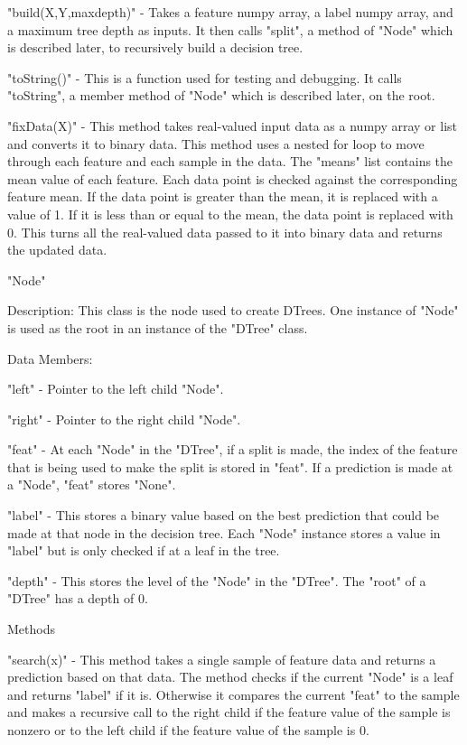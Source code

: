\documentclass{article}
\begin{document}
\indent \textbullet "build(X,Y,max\textunderscore depth)" - Takes a feature numpy array, a label numpy array, and a maximum tree depth as inputs. It then calls "split", a method of "Node" which is described later, to recursively build a decision tree. 

\indent \textbullet "toString()" - This is a function used for testing and debugging. It calls "toString", a member method of "Node" which is described later, on the root.

\indent \textbullet "fixData(X)" - This method takes real-valued input data as a numpy array or list and converts it to binary data. This method uses a nested for loop to move through each feature and each sample in the data. The "means" list contains the mean value of each feature. Each data point is checked against the corresponding feature mean. If the data point is greater than the mean, it is replaced with a value of 1. If it is less than or equal to the mean, the data point is replaced with 0. This turns all the real-valued data passed to it into binary data and returns the updated data. 

\pagebreak

\noindent "Node"

\indent Description: This class is the node used to create DTrees. One instance of "Node" is used as the root in an instance of the "DTree" class. 

\indent Data Members:

\indent \textbullet "left" - Pointer to the left child "Node".

\indent \textbullet "right" - Pointer to the right child "Node".

\indent \textbullet "feat" - At each "Node" in the "DTree", if a split is made, the index of the feature that is being used to make the split is stored in "feat". If a prediction is made at a "Node", "feat" stores "None".

\indent \textbullet "label" - This stores a binary value based on the best prediction that could be made at that node in the decision tree. Each "Node" instance stores a value in "label" but is only checked if at a leaf in the tree.

\indent \textbullet "depth" - This stores the level of the "Node" in the "DTree". The "root" of a "DTree" has a depth of 0.

\indent Methods

\indent \textbullet "search(x)" - This method takes a single sample of feature data and returns a prediction based on that data. The method checks if the current "Node" is a leaf and returns "label" if it is. Otherwise it compares the current "feat" to the sample and makes a recursive call to the right child if the feature value of the sample is nonzero or to the left child if the feature value of the sample is 0.
\end{document}
